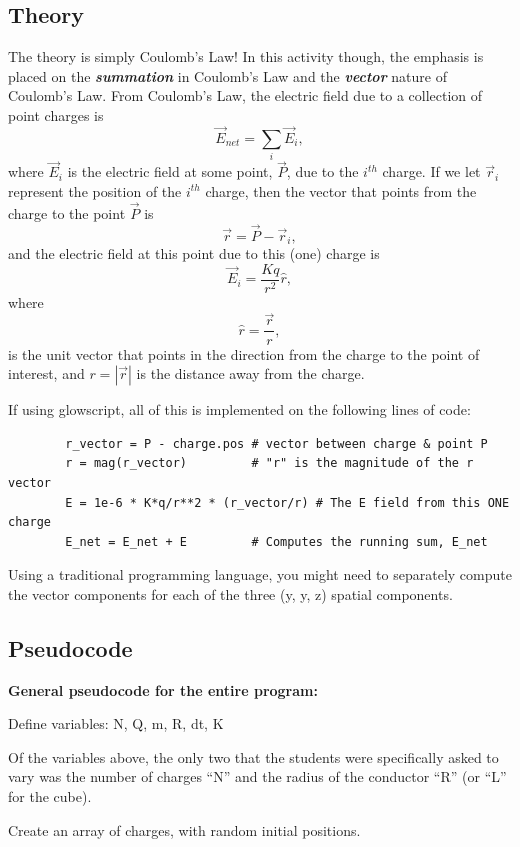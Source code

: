 \documentclass[]{article}
\begin{document}
\subsection{Theory}\label{theory}

The theory is simply Coulomb's Law! In this activity though, the
emphasis is placed on the \textbf{\emph{summation}} in Coulomb's Law and
the \textbf{\emph{vector}} nature of Coulomb's Law. From Coulomb's Law,
the electric field due to a collection of point charges is
\[\vec{E}_{net} = \sum_i \vec{E}_i,\] where \(\vec{E}_i\) is the
electric field at some point, \(\vec{P}\), due to the \(i^{th}\) charge.
If we let \(\vec{r}_i\) represent the position of the \(i^{th}\) charge,
then the vector that points from the charge to the point \(\vec{P}\) is
\[\vec{r} = \vec{P} - \vec{r}_i,\] and the electric field at this point
due to this (one) charge is \[\vec{E}_i = \frac{K q}{r^2}\hat{r},\]
where \[\hat{r} = \frac{\vec{r}}{r},\] is the unit vector that points in
the direction from the charge to the point of interest, and
\(r = |\vec{r}|\) is the distance away from the charge.

If using glowscript, all of this is implemented on the following lines
of code:

\begin{verbatim}
        r_vector = P - charge.pos # vector between charge & point P
        r = mag(r_vector)         # "r" is the magnitude of the r vector
        E = 1e-6 * K*q/r**2 * (r_vector/r) # The E field from this ONE charge
        E_net = E_net + E         # Computes the running sum, E_net
\end{verbatim}

Using a traditional programming language, you might need to separately
compute the vector components for each of the three (y, y, z) spatial
components.

\subsection{Pseudocode}\label{pseudocode}

\textbf{General pseudocode for the entire program:}

Define variables: N, Q, m, R, dt, K

Of the variables above, the only two that the students were specifically
asked to vary was the number of charges ``N'' and the radius of the
conductor ``R'' (or ``L'' for the cube).

Create an array of charges, with random initial positions.
\end{document}
